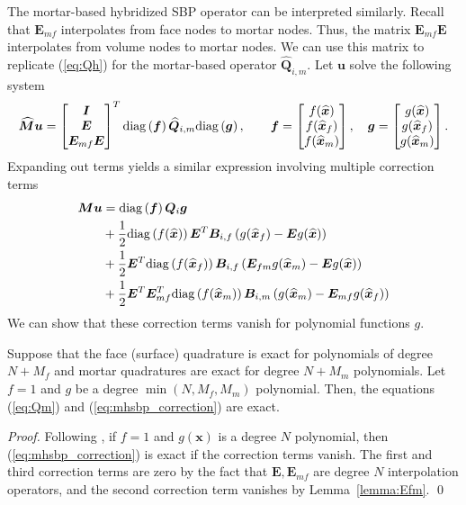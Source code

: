 \documentclass{svjour3}                     %
\renewcommand{\hat}{\widehat}
\newcommand{\diag}[1]{{\rm diag}\LRp{#1}}
\newcommand{\LRp}[1]{\left( #1 \right)}
\begin{document}
The mortar-based hybridized SBP operator can be interpreted similarly.  Recall that $\bm{E}_{mf}$ interpolates from face nodes to mortar nodes.  Thus, the matrix $\bm{E}_{mf}\bm{E}$ interpolates from volume nodes to mortar nodes.  We can use this matrix to replicate (\ref{eq:Qh}) for the mortar-based operator $\hat{\bm{Q}}_{i,m}$.  Let $\bm{u}$ solve the following system
\begin{align}
\hat{\bm{M}}\bm{u} = \begin{bmatrix}
\bm{I}\\
\bm{E}\\
\bm{E}_{mf}\bm{E}
\end{bmatrix}^T \diag{\bm{f}}\hat{\bm{Q}}_{i,m} \diag{\bm{g}}, \qquad \bm{f} = \begin{bmatrix} f(\hat{\bm{x}}) \\ f(\hat{\bm{x}}_f)\\ f(\hat{\bm{x}}_m)\end{bmatrix}, \quad \bm{g} = \begin{bmatrix} g(\hat{\bm{x}}) \\ g(\hat{\bm{x}}_f)\\ g(\hat{\bm{x}}_m)\end{bmatrix}.
\label{eq:Qm}
\end{align}
Expanding out terms yields a similar expression involving multiple correction terms
\begin{align}
\bm{M}\bm{u} &= \diag{\bm{f}}\bm{Q}_i\bm{g} \label{eq:mhsbp_correction}\\
&+ \frac{1}{2} \diag{f(\hat{\bm{x}})}\bm{E}^T\bm{B}_{i,f}\LRp{g(\hat{\bm{x}}_f) - \bm{E}g(\hat{\bm{x}})} \nonumber\\
&+ \frac{1}{2} \bm{E}^T\diag{f(\hat{\bm{x}}_f)}\bm{B}_{i,f}\LRp{\bm{E}_{fm}g(\hat{\bm{x}}_m) - \bm{E}g(\hat{\bm{x}})} \nonumber\\
&+ \frac{1}{2} \bm{E}^T\bm{E}_{mf}^T\diag{f(\hat{\bm{x}}_m)}\bm{B}_{i,m}\LRp{g(\hat{\bm{x}}_m) - \bm{E}_{mf}g(\hat{\bm{x}}_f)} \nonumber
\end{align}
We can show that these correction terms vanish for polynomial functions $g$.  %

\begin{lemma}
Suppose that the face (surface) quadrature is exact for polynomials of degree $N+M_f$ and mortar quadratures are exact for degree $N+M_m$ polynomials.  Let $f = 1$ and $g$ be a degree $\min(N,M_f,M_m)$ polynomial.  Then, the equations (\ref{eq:Qm}) and (\ref{eq:mhsbp_correction}) are exact.
\end{lemma}
\begin{proof}
Following \cite{chan2017discretely}, if $f = 1$  and $g(\bm{x})$ is a degree $N$ polynomial, then  (\ref{eq:mhsbp_correction}) is exact if the correction terms vanish.  The first and third correction terms are zero by the fact that $\bm{E}, \bm{E}_{mf}$ are degree $N$ interpolation operators, and the second correction term vanishes by Lemma~\ref{lemma:Efm}.
\qed\end{proof}
\end{document}
